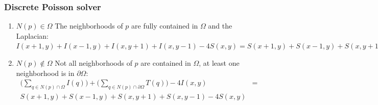 \documentclass{beamer}
\begin{document}
\begin{frame}
    \frametitle{Discrete Poisson solver}    
        \begin{enumerate}
            \item $N(p) \in \Omega$ The neighborhoods of $p$ are fully contained in $\Omega$ and the Laplacian: 
            $I(x+1,y)+I(x-1,y)+I(x,y+1)+I(x,y-1)-4S(x,y)=S(x+1,y)+S(x-1,y)+S(x,y+1)+S(x,y-1)-4S(x,y)$
            \item $N(p) \notin \Omega$ Not all neighborhoods of $p$ are contained in $\Omega$, at least one neighborhood is in $\partial \Omega$:
            \[
                \begin{split}
                    \Bigg(\sum_{q \in N(p) \cap \Omega}I(q)\Bigg)     
                    +\Bigg(\sum_{q \in N(p) \cap \partial \Omega}T(q)\Bigg)     
                    -4I(x,y) &= \\ S(x+1,y)+S(x-1,y)+S(x,y+1)+S(x,y-1)-4S(x,y)
                \end{split}
            \]
        \end{enumerate}    
\end{frame} 
\end{document}
